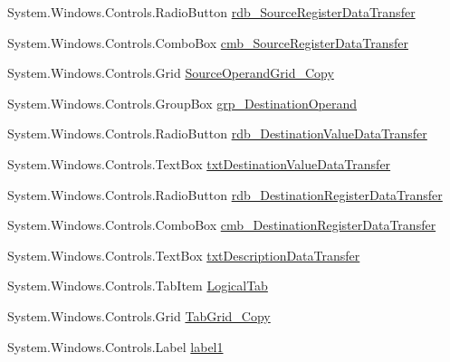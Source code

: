 \begin{DoxyCompactItemize}
\item 
System.\+Windows.\+Controls.\+Radio\+Button \hyperlink{class_c_p_u___o_s___simulator_1_1_instructions_window_a0d449427537f2c5baea2e2b7e669a9d7}{rdb\+\_\+\+Source\+Register\+Data\+Transfer}
\item 
System.\+Windows.\+Controls.\+Combo\+Box \hyperlink{class_c_p_u___o_s___simulator_1_1_instructions_window_ae2136d0a711f92a681278571fbe2868b}{cmb\+\_\+\+Source\+Register\+Data\+Transfer}
\item 
System.\+Windows.\+Controls.\+Grid \hyperlink{class_c_p_u___o_s___simulator_1_1_instructions_window_a46fbe457dccbe131387644a73cc19b19}{Source\+Operand\+Grid\+\_\+\+Copy}
\item 
System.\+Windows.\+Controls.\+Group\+Box \hyperlink{class_c_p_u___o_s___simulator_1_1_instructions_window_a836175caed2a6d02d8635bb6cc3f6cae}{grp\+\_\+\+Destination\+Operand}
\item 
System.\+Windows.\+Controls.\+Radio\+Button \hyperlink{class_c_p_u___o_s___simulator_1_1_instructions_window_a03ff2485a6554464a5c6c2b012dafd1a}{rdb\+\_\+\+Destination\+Value\+Data\+Transfer}
\item 
System.\+Windows.\+Controls.\+Text\+Box \hyperlink{class_c_p_u___o_s___simulator_1_1_instructions_window_a84f7cc6d64bd8050be7c729f469cd29c}{txt\+Destination\+Value\+Data\+Transfer}
\item 
System.\+Windows.\+Controls.\+Radio\+Button \hyperlink{class_c_p_u___o_s___simulator_1_1_instructions_window_a00e9e3013355f592d97a38b29e94899c}{rdb\+\_\+\+Destination\+Register\+Data\+Transfer}
\item 
System.\+Windows.\+Controls.\+Combo\+Box \hyperlink{class_c_p_u___o_s___simulator_1_1_instructions_window_a2cf44cbfe54b2d8f024d5c06067320a1}{cmb\+\_\+\+Destination\+Register\+Data\+Transfer}
\item 
System.\+Windows.\+Controls.\+Text\+Box \hyperlink{class_c_p_u___o_s___simulator_1_1_instructions_window_a58152c12c2022edc73b39c1f95ec7ba4}{txt\+Description\+Data\+Transfer}
\item 
System.\+Windows.\+Controls.\+Tab\+Item \hyperlink{class_c_p_u___o_s___simulator_1_1_instructions_window_a06c53026f495bcbdad82e84bbcb6611c}{Logical\+Tab}
\item 
System.\+Windows.\+Controls.\+Grid \hyperlink{class_c_p_u___o_s___simulator_1_1_instructions_window_a0f8731825bc5369e0328b2b9580e9b67}{Tab\+Grid\+\_\+\+Copy}
\item 
System.\+Windows.\+Controls.\+Label \hyperlink{class_c_p_u___o_s___simulator_1_1_instructions_window_a499640eb8a98693f1833dad30f5d8cb4}{label1}

\end{DoxyCompactItemize}
